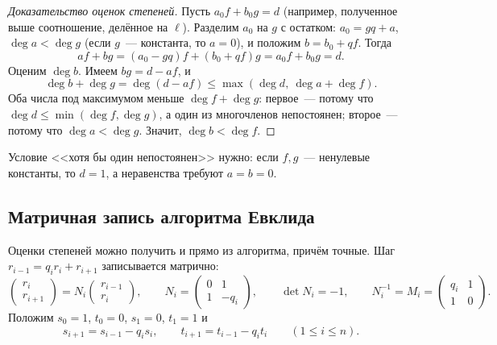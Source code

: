 \begin{proof}[Доказательство оценок степеней]
Пусть $a_0f+b_0g=d$ (например, полученное выше соотношение, делённое на $\ell$). Разделим $a_0$ на $g$ с остатком:
$a_0=gq+a$, $\deg a<\deg g$ (если $g$~--- константа, то $a=0$), и положим $b=b_0+qf$. Тогда
\[
af+bg=(a_0-gq)f+(b_0+qf)g=a_0f+b_0g=d .
\]
Оценим $\deg b$. Имеем $bg=d-af$, и
\[
\deg b+\deg g=\deg(d-af)\le\max(\deg d,\ \deg a+\deg f).
\]
Оба числа под максимумом меньше $\deg f+\deg g$: первое~--- потому что $\deg d\le\min(\deg f,\deg g)$, а один из
многочленов непостоянен; второе~--- потому что $\deg a<\deg g$. Значит, $\deg b<\deg f$.
\end{proof}

Условие <<хотя бы один непостоянен>> нужно: если $f,g$~--- ненулевые константы, то $d=1$, а неравенства требуют
$a=b=0$.

\subsection*{Матричная запись алгоритма Евклида}

Оценки степеней можно получить и прямо из алгоритма, причём точные. Шаг $r_{i-1}=q_ir_i+r_{i+1}$ записывается
матрично:
\[
\begin{pmatrix}r_i\\ r_{i+1}\end{pmatrix}=N_i\begin{pmatrix}r_{i-1}\\ r_i\end{pmatrix},\qquad
N_i=\begin{pmatrix}0&1\\1&-q_i\end{pmatrix},\qquad \det N_i=-1,\qquad
N_i^{-1}=M_i=\begin{pmatrix}q_i&1\\1&0\end{pmatrix}.
\]
Положим $s_0=1$, $t_0=0$, $s_1=0$, $t_1=1$ и
\[
s_{i+1}=s_{i-1}-q_is_i,\qquad t_{i+1}=t_{i-1}-q_it_i\qquad(1\le i\le n).
\]

